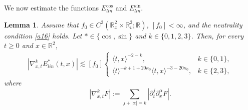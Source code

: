\documentclass[reqno,11pt]{amsart}
\numberwithin{equation}{section}
\newtheorem{lemma}[theorem]{Lemma}
\begin{document}
	We now estimate the functions $E^{\cos}_{lin}$ and $E^{\sin}_{lin}$.
	\begin{lemma}\label{eslinear}
		Assume that $f_0\in C^3(\mathbb R_x^2\times\mathbb R_v^2;\mathbb R)$,
		$[f_0]<\infty$, and the neutrality condition \eqref{a16} holds.
		Let $\ast\in\{\cos,\sin\}$ and $k\in\{0,1,2,3\}$. Then, for every
		$t\geq0$ and $x\in\mathbb R^2$,
		\begin{align}\label{a23}
			|\nabla_{x,t}^k E_{lin}^{\ast}(t,x)|
			\lesssim [f_0]
			\begin{cases}
				\langle t,x\rangle^{-2-k},&k\in\{0,1\},\\
				\langle t\rangle^{-k+1+20\kappa_0}
				\langle t,x\rangle^{-3-20\kappa_0},&k\in\{2,3\},
			\end{cases}
		\end{align}
		where
		\[
		|\nabla_{x,t}^kF|:=
		\sum_{j+|\alpha|=k}|\partial_t^j\partial_x^\alpha F|.
		\]
	\end{lemma}
	
\end{document}
